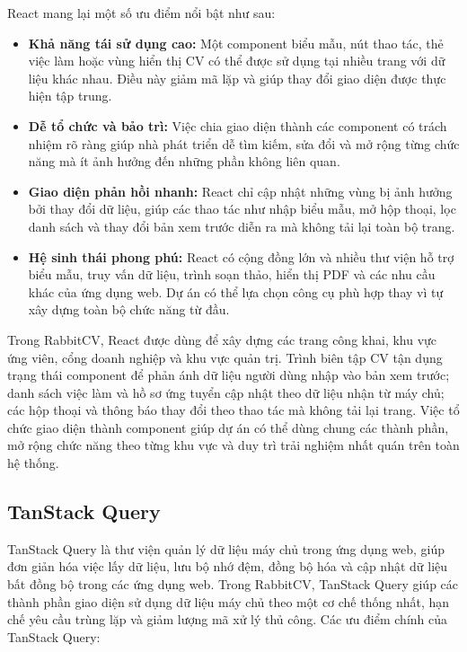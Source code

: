 \medskip
React mang lại một số ưu điểm nổi bật như sau:
\medskip

\begin{itemize}
    \item \textbf{Khả năng tái sử dụng cao:} Một component biểu mẫu, nút thao tác, thẻ việc làm hoặc vùng hiển thị CV có thể được sử dụng tại nhiều trang với dữ liệu khác nhau. Điều này giảm mã lặp và giúp thay đổi giao diện được thực hiện tập trung.

    \item \textbf{Dễ tổ chức và bảo trì:} Việc chia giao diện thành các component có trách nhiệm rõ ràng giúp nhà phát triển dễ tìm kiếm, sửa đổi và mở rộng từng chức năng mà ít ảnh hưởng đến những phần không liên quan.

    \item \textbf{Giao diện phản hồi nhanh:} React chỉ cập nhật những vùng bị ảnh hưởng bởi thay đổi dữ liệu, giúp các thao tác như nhập biểu mẫu, mở hộp thoại, lọc danh sách và thay đổi bản xem trước diễn ra mà không tải lại toàn bộ trang.

    \item \textbf{Hệ sinh thái phong phú:} React có cộng đồng lớn và nhiều thư viện hỗ trợ biểu mẫu, truy vấn dữ liệu, trình soạn thảo, hiển thị PDF và các nhu cầu khác của ứng dụng web. Dự án có thể lựa chọn công cụ phù hợp thay vì tự xây dựng toàn bộ chức năng từ đầu.
\end{itemize}

Trong RabbitCV, React được dùng để xây dựng các trang công khai, khu vực ứng viên, cổng doanh nghiệp và khu vực quản trị. Trình biên tập CV tận dụng trạng thái component để phản ánh dữ liệu người dùng nhập vào bản xem trước; danh sách việc làm và hồ sơ ứng tuyển cập nhật theo dữ liệu nhận từ máy chủ; các hộp thoại và thông báo thay đổi theo thao tác mà không tải lại trang. Việc tổ chức giao diện thành component giúp dự án có thể dùng chung các thành phần, mở rộng chức năng theo từng khu vực và duy trì trải nghiệm nhất quán trên toàn hệ thống.

\subsection{TanStack Query}

TanStack Query là thư viện quản lý dữ liệu máy chủ trong ứng dụng web, giúp đơn giản hóa việc lấy dữ liệu, lưu bộ nhớ đệm, đồng bộ hóa và cập nhật dữ liệu bất đồng bộ trong các ứng dụng web. Trong RabbitCV, TanStack Query giúp các thành phần giao diện sử dụng dữ liệu máy chủ theo một cơ chế thống nhất, hạn chế yêu cầu trùng lặp và giảm lượng mã xử lý thủ công. Các ưu điểm chính của TanStack Query:

